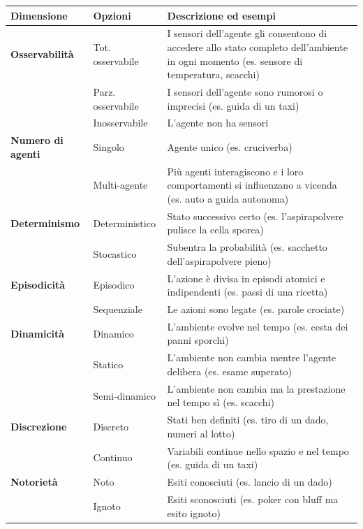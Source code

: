 \begin{center}
\small
\renewcommand{\arraystretch}{1.3}
\begin{tabular}{@{} >{\bfseries}p{2.6cm} p{2.6cm} p{7.0cm} @{}}
\toprule
\textbf{Dimensione} & \textbf{Opzioni} & \textbf{Descrizione ed esempi} \\
\midrule
Osservabilità & Tot. osservabile & I sensori dell'agente gli consentono di accedere allo stato completo dell'ambiente in ogni momento (es. sensore di temperatura, scacchi) \\
              & Parz. osservabile & I sensori dell'agente sono rumorosi o imprecisi (es. guida di un taxi) \\
              & Inosservabile & L'agente non ha sensori \\
\midrule
Numero di agenti & Singolo & Agente unico (es. cruciverba) \\
                 & Multi-agente & Più agenti interagiscono e i loro comportamenti si influenzano a vicenda (es. auto a guida autonoma) \\
\midrule
Determinismo & Deterministico & Stato successivo certo (es. l'aspirapolvere pulisce la cella sporca) \\
             & Stocastico & Subentra la probabilità (es. sacchetto dell'aspirapolvere pieno) \\
\midrule
Episodicità & Episodico & L'azione è divisa in episodi atomici e indipendenti (es. passi di una ricetta) \\
            & Sequenziale & Le azioni sono legate (es. parole crociate) \\
\midrule
Dinamicità & Dinamico & L'ambiente evolve nel tempo (es. cesta dei panni sporchi) \\
           & Statico & L'ambiente non cambia mentre l'agente delibera (es. esame superato) \\
           & Semi-dinamico & L'ambiente non cambia ma la prestazione nel tempo sì (es. scacchi) \\
\midrule
Discrezione & Discreto & Stati ben definiti (es. tiro di un dado, numeri al lotto) \\
            & Continuo & Variabili continue nello spazio e nel tempo (es. guida di un taxi) \\
\midrule
Notorietà & Noto & Esiti conosciuti (es. lancio di un dado) \\
          & Ignoto & Esiti sconosciuti (es. poker con bluff ma esito ignoto) \\
\bottomrule
\end{tabular}
\normalsize
\end{center}

